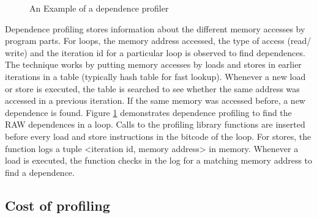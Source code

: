 \documentclass[10pt]{report}          %
\begin{document}
\begin{figure}[h]
\begin{center}
\caption{An Example of a dependence profiler}
\end{center}
\label{fig:dep_profiler}
\end{figure}

Dependence profiling stores information about the different memory accesses by program parts.  For loops, the memory address accessed, the type of access (read/ write) and the iteration id for a particular loop is observed to find dependences.  The technique works by putting memory accesses by loads and stores in earlier iterations in a table (typically hash table for fast lookup).  Whenever a new load or store is executed, the table is searched to see whether the same address was accessed in a previous iteration.  If the same memory was accessed before, a new dependence is found. Figure \ref{fig:dep_profiler} demonstrates dependence profiling to find the RAW dependences in a loop.  Calls to the profiling library functions are inserted before every load and store instructions in the bitcode of the loop. For stores, the function logs a tuple <iteration id, memory address> in memory. Whenever a load is executed, the function checks in the log for a matching memory address to find a dependence.

\subsection{Cost of profiling}
\end{document}
